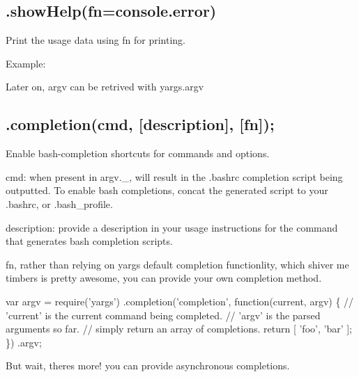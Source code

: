 \subsection*{.show\+Help(fn=console.\+error) }

Print the usage data using {\ttfamily fn} for printing.

Example\+:




Later on, {\ttfamily argv} can be retrived with {\ttfamily yargs.\+argv}

\subsection*{.completion(cmd, \mbox{[}description\mbox{]}, \mbox{[}fn\mbox{]}); }

Enable bash-\/completion shortcuts for commands and options.

{\ttfamily cmd}\+: when present in {\ttfamily argv.\+\_\+}, will result in the {\ttfamily .bashrc} completion script being outputted. To enable bash completions, concat the generated script to your {\ttfamily .bashrc}, or {\ttfamily .bash\+\_\+profile}.

{\ttfamily description}\+: provide a description in your usage instructions for the command that generates bash completion scripts.

{\ttfamily fn}, rather than relying on yargs\textquotesingle{} default completion functionlity, which shiver me timbers is pretty awesome, you can provide your own completion method.


\begin{DoxyCode}
var argv = require(\textcolor{stringliteral}{'yargs'})
  .completion(\textcolor{stringliteral}{'completion'}, \textcolor{keyword}{function}(current, argv) \{
    \textcolor{comment}{// 'current' is the current command being completed.}
    \textcolor{comment}{// 'argv' is the parsed arguments so far.}
    \textcolor{comment}{// simply return an array of completions.}
    \textcolor{keywordflow}{return} [
      \textcolor{stringliteral}{'foo'},
      \textcolor{stringliteral}{'bar'}
    ];
  \})
  .argv;
\end{DoxyCode}


But wait, there\textquotesingle{}s more! you can provide asynchronous completions.


